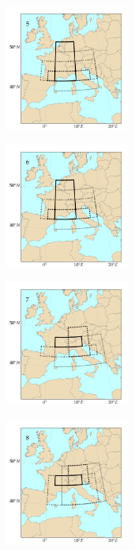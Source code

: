 \documentclass[twocol]{ametsoc}
\begin{document}
\begin{figure}[htb]
\begin{subfigure}{.5\columnwidth}
	\end{subfigure}
	\begin{subfigure}{.5\columnwidth}
		\centering
		\includegraphics[width=4.1cm]{figures/spatial_win_z4/Spatial_windows_5.png}
	\end{subfigure}%
	\begin{subfigure}{.5\columnwidth}
		\centering
		\includegraphics[width=4.1cm]{figures/spatial_win_z4/Spatial_windows_6.png}
	\end{subfigure}
	\begin{subfigure}{.5\columnwidth}
		\centering
		\includegraphics[width=4.1cm]{figures/spatial_win_z4/Spatial_windows_7.png}
	\end{subfigure}%
	\begin{subfigure}{.5\columnwidth}
		\centering
		\includegraphics[width=4.1cm]{figures/spatial_win_z4/Spatial_windows_8.png}

\end{subfigure}
\end{figure}
\end{document}

